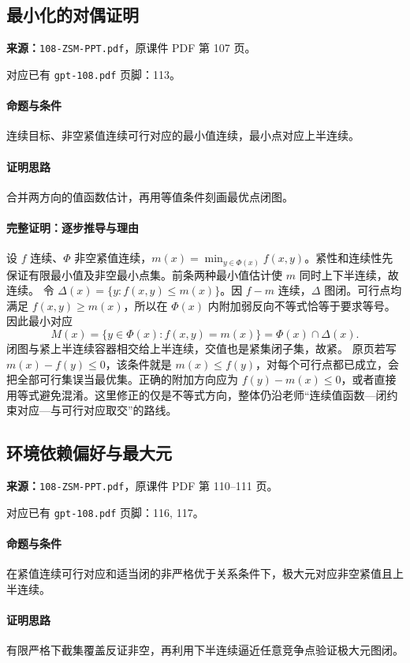 \clearpage\subsection{最小化的对偶证明}
\textbf{来源：}\texttt{108-ZSM-PPT.pdf}，原课件 PDF 第 107 页。\par
对应已有 \texttt{gpt-108.pdf} 页脚：113。\par
\paragraph{命题与条件}连续目标、非空紧值连续可行对应的最小值连续，最小点对应上半连续。
\paragraph{证明思路}合并两方向的值函数估计，再用等值条件刻画最优点闭图。
\paragraph{完整证明：逐步推导与理由}

设 $f$ 连续、$\Phi$ 非空紧值连续，$m(x)=\min_{y\in\Phi(x)}f(x,y)$。紧性和连续性先保证有限最小值及非空最小点集。前条两种最小值估计使 $m$ 同时上下半连续，故连续。
令 $\Delta(x)=\{y:f(x,y)\le m(x)\}$。因 $f-m$ 连续，$\Delta$ 图闭。可行点均满足 $f(x,y)\ge m(x)$，所以在 $\Phi(x)$ 内附加弱反向不等式恰等于要求等号。因此最小对应
\[M(x)=\{y\in\Phi(x):f(x,y)=m(x)\}=\Phi(x)\cap\Delta(x).\]
闭图与紧上半连续容器相交给上半连续，交值也是紧集闭子集，故紧。
原页若写 $m(x)-f(y)\le0$，该条件就是 $m(x)\le f(y)$，对每个可行点都已成立，会把全部可行集误当最优集。正确的附加方向应为 $f(y)-m(x)\le0$，或者直接用等式避免混淆。这里修正的仅是不等式方向，整体仍沿老师“连续值函数—闭约束对应—与可行对应取交”的路线。

\clearpage\subsection{环境依赖偏好与最大元}
\textbf{来源：}\texttt{108-ZSM-PPT.pdf}，原课件 PDF 第 110--111 页。\par
对应已有 \texttt{gpt-108.pdf} 页脚：116, 117。\par
\paragraph{命题与条件}在紧值连续可行对应和适当闭的非严格优于关系条件下，极大元对应非空紧值且上半连续。
\paragraph{证明思路}有限严格下截集覆盖反证非空，再利用下半连续逼近任意竞争点验证极大元图闭。
